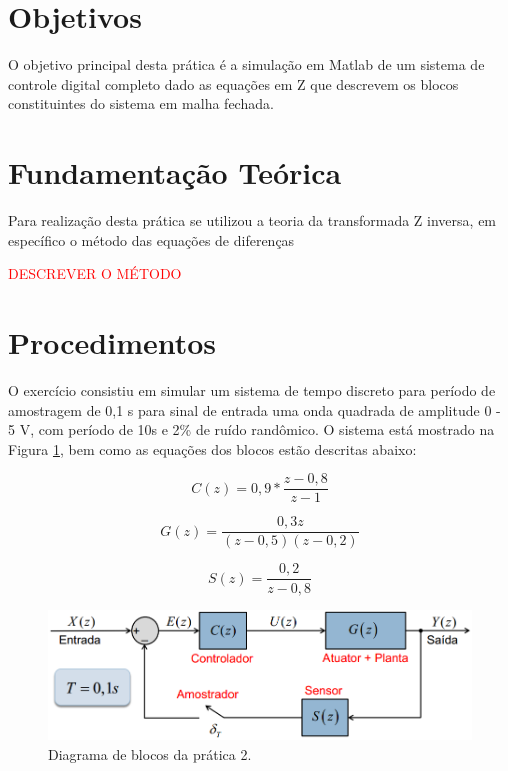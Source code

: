 \section{Objetivos}
 O objetivo principal desta prática é a simulação em Matlab de um sistema de controle digital completo dado as equações em Z que descrevem os blocos constituintes do sistema em malha fechada.

\section{Fundamentação Teórica}
Para realização desta prática se utilizou a teoria da transformada Z inversa, em específico o método das equações de diferenças

\textcolor{red}{DESCREVER O MÉTODO}

\section{Procedimentos}
O exercício consistiu em simular um sistema de tempo discreto para período de amostragem de 0,1 s para sinal de entrada uma onda quadrada de amplitude 0 - 5 V, com período de 10s e 2\% de ruído randômico. O sistema está mostrado na Figura \ref{fig:pr2_esquema}, bem como as equações dos blocos estão descritas abaixo:

\begin{equation}
C(z) = 0,9*\frac{z-0,8}{z-1}
\label{pr_2_C}
\end{equation}

\begin{equation}
	G(z) = \frac{0,3z}{(z-0,5)(z-0,2)}
    \label{pr_2_G}
\end{equation}

\begin{equation}
	S(z) = \frac{0,2}{z-0,8}
    \label{pr_2_S}
\end{equation}

\begin{figure}[!th]
	\centering
    \includegraphics[scale = .5]{Imagens/Execicio1_pr2.PNG}
    \caption{Diagrama de blocos da prática 2.}
    \label{fig:pr2_esquema}
\end{figure}

